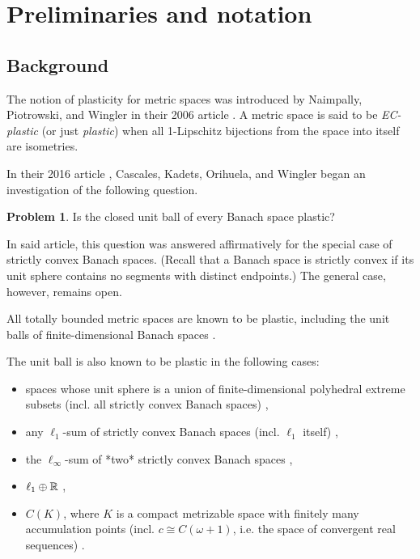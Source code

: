 \documentclass{amsart}
\theoremstyle{definition}
\newtheorem*{prob*}{Problem}
\begin{document}
\section{Preliminaries and notation}

\subsection{Background}

The notion of plasticity for metric spaces was introduced by Naimpally, Piotrowski, and Wingler in their 2006 article \autocite{naimpally:2006}.
A metric space is said to be \textit{EC-plastic} (or just \textit{plastic}) when
all 1-Lipschitz bijections from the space into itself are isometries.

In their 2016 article \autocite{cascales:2016}, Cascales, Kadets, Orihuela, and Wingler began an investigation
of the following question.

\begin{prob*}
    Is the closed unit ball of every Banach space plastic?
\end{prob*}

In said article, this question was answered affirmatively for the special case of strictly convex Banach spaces. (Recall that a Banach
space is strictly convex if its
unit sphere contains no segments with distinct
endpoints.) The general case, however, remains open.

All totally bounded metric spaces are known to be plastic, including the unit balls of finite-dimensional Banach spaces \autocite{naimpally:2006}.

The unit ball is also known to be plastic
in the following cases:
\begin{itemize}
    \item spaces whose unit sphere is a union of finite-dimensional polyhedral extreme subsets (incl. all strictly convex Banach spaces) \autocite{angosto:2019,cascales:2016},
    \item any $\ell_1$-sum of strictly convex Banach spaces 
    (incl. $\ell_1$ itself) \autocite{kadets_zavarzina:2016,kadets_zavarzina:2018},
    \item the $\ell_\infty$-sum of *two* strictly convex Banach spaces \autocite{haller:2022},
    \item $\ell_1 \oplus \mathbb{R}$ \autocite{haller:2022},
    \item $C(K)$, where $K$ is a compact metrizable space with finitely many
    accumulation points (incl. $c \cong C(\omega+1)$, i.e. the space of convergent real sequences)
    \autocite{fakhoury:2024,leo:2022}.
\end{itemize}
\end{document}
